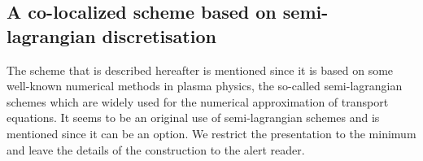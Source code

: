%
\subsection{A co-localized scheme based on semi-lagrangian discretisation}


The scheme that is described hereafter is mentioned since it is based on some well-known 
numerical methods in plasma physics, the so-called semi-lagrangian schemes 
which are widely used for the numerical approximation of transport equations.
It seems to be an original use of semi-lagrangian schemes 
and is mentioned since it can be an option. 
We restrict the presentation to the minimum and leave the details  of the construction to the alert reader.

